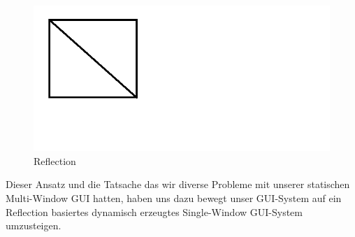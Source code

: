 \begin{figure}[h!]
	\vspace*{30px}
	\includegraphics[width=\columnwidth]{graphics/reflection.png}	
	\caption{Reflection}
	\label{fig:Reflection}
\end{figure}

Dieser Ansatz und die Tatsache das wir diverse Probleme mit unserer statischen Multi-Window GUI hatten, haben uns dazu bewegt unser GUI-System auf ein Reflection basiertes dynamisch erzeugtes Single-Window GUI-System umzusteigen.
\clearpage
